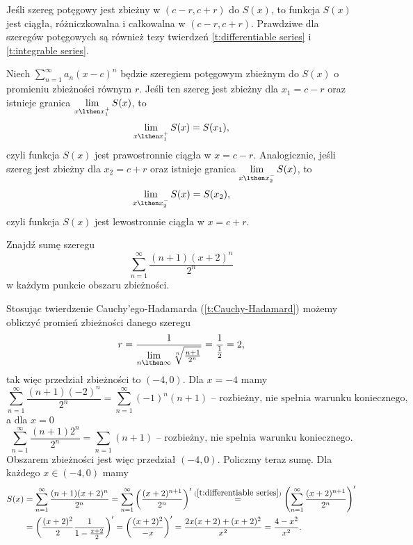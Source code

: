 \begin{fact}
    Jeśli szereg potęgowy jest zbieżny w $(c-r, c+r)$ do $S(x)$, to funkcja $S(x)$ jest ciągła, różniczkowalna i całkowalna w $(c-r, c+r)$. Prawdziwe dla szeregów potęgowych są również tezy twierdzeń \ref{t:differentiable series} i \ref{t:integrable series}.
\end{fact}

\begin{theorem}[Abela]
    \label{t:Abel}
    Niech $\sum_{n=1}^\infty a_n(x - c)^n$ będzie szeregiem potęgowym zbieżnym do $S(x)$ o promieniu zbieżności równym $r$. Jeśli ten szereg jest zbieżny dla $x_1 = c - r$ oraz istnieje granica $\lim\limits_{x\lthen x_1^+}S(x)$, to
    \[ \lim_{x\lthen x_1^+}S(x) = S(x_1), \]
    czyli funkcja $S(x)$ jest prawostronnie ciągła w $x = c - r$. Analogicznie, jeśli szereg jest zbieżny dla $x_2 = c + r$ oraz istnieje granica $\lim\limits_{x\lthen x_2^-}S(x)$, to
    \[ \lim_{x\lthen x_2^-}S(x) = S(x_2), \]
    czyli funkcja $S(x)$ jest lewostronnie ciągła w $x = c + r$.
\end{theorem}

\begin{example}
    Znajdź sumę szeregu
    \[ \sum_{n=1}^\infty\frac{(n+1)(x+2)^n}{2^n} \]
    w każdym punkcie obszaru zbieżności.
\end{example}
\begin{solution}
    Stosując twierdzenie Cauchy'ego-Hadamarda (\ref{t:Cauchy-Hadamard}) możemy obliczyć promień zbieżności danego szeregu
    \[ r = \frac{1}{\lim\limits_{n\lthen\infty}\sqrt[n]{\frac{n+1}{2^n}}} = \frac{1}{\frac{1}{2}} = 2, \]
    tak więc przedział zbieżności to $(-4, 0)$.
    Dla $x = -4$ mamy
    \[ \sum_{n=1}^\infty\frac{(n+1)(-2)^n}{2^n} = \sum_{n=1}^\infty(-1)^n(n+1) \text{ -- rozbieżny, nie spełnia warunku koniecznego}, \]
    a dla $x = 0$
    \[ \sum_{n=1}^\infty\frac{(n+1)2^n}{2^n} = \sum_{n=1}(n+1) \text{ -- rozbieżny, nie spełnia warunku koniecznego}. \]
    Obszarem zbieżności jest więc przedział $(-4, 0)$. Policzmy teraz sumę. Dla każdego $x \in (-4, 0)$ mamy
    \begin{align*}
        S(x) &= \sum_{n=1}^\infty\frac{(n+1)(x+2)^n}{2^n} = \sum_{n=1}^\infty \left(\frac{(x+2)^{n+1}}{2^n}\right)' \overset{(\ref{t:differentiable series})}{=} \left(\sum_{n=1}^\infty\frac{(x+2)^{n+1}}{2^n}\right)' \\
        &= \left(\frac{(x+2)^2}{2}\frac{1}{1 - \frac{x+2}{2}}\right)' = \left(\frac{(x+2)^2}{-x}\right)' = \frac{2x(x+2) + (x+2)^2}{x^2} = \frac{4 - x^2}{x^2}.
    \end{align*}
\end{solution}

